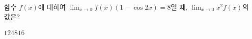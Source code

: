 함수 $f(x)$에 대하여 $\displaystyle\lim_{x\to 0}f(x)(1-\cos 2x)=8$일 때, $\displaystyle\lim_{x\to 0}x^2f(x)$의 값은?
\begin{choices32}{$1$}{$2$}{$4$}{$8$}{$16$}\end{choices32}

